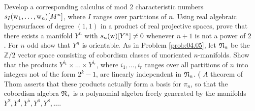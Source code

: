 \documentclass[../main]{subfiles}
\begin{document}
\begin{problem}\label{prob:16.F}
 Develop a corresponding calculus of mod $2$ characteristic numbers $s_{I}(\operatorname{w}_{1}, \ldots, \operatorname{w}_{n})[M^{n}]$, where $I$ ranges over partitions of $n$. Using real algebraic hypersurfaces of degree $(1,1)$ in a product of real projective spaces, prove that there exists a manifold $Y^{n}$ with $s_{n}(\operatorname{w})[Y^{n}]\neq 0$ whenever $n+1$ is not a power of 2 . For $n$ odd show that $Y^{n}$ is orientable. As in Problem \ref{prob:04.05}, let $\mathfrak{N}_n$ be the $\mathbb{Z} / 2$ vector space consisting of cobordism classes of unoriented $n$-manifolds. Show that the products $Y^{i_{1}} \times \ldots \times Y^{i_{r}}$, where $i_{1}, \ldots, i_{r}$ ranges over all partitions of $n$ into integers not of the form $2^{k}-1$, are linearly independent in $\mathfrak{N}_{n}$. ( $A$ theorem of Thom asserts that these products actually form a basis for $\pi_{n}$, so that the cobordism algebra $\mathfrak{N}_{*}$ is a polynomial algebra freely generated by the manifolds $Y^{2}, Y^{4}, Y^{5}, Y^{6}, Y^{8}, \ldots$.
\end{problem}
\end{document}
